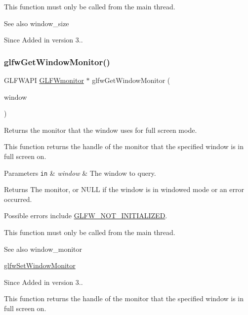 This function must only be called from the main thread.

\begin{DoxySeeAlso}{See also}
window\+\_\+size
\end{DoxySeeAlso}
\begin{DoxySince}{Since}
Added in version 3.. 
\end{DoxySince}
\mbox{\label{group__window_gad441645a53bc9274a0ee163d40f0c637}} 
\subsubsection{\texorpdfstring{glfw\+Get\+Window\+Monitor()}{glfwGetWindowMonitor()}}
{\footnotesize\ttfamily G\+L\+F\+W\+A\+PI \hyperlink{group__monitor_ga8d9efd1cde9426692c73fe40437d0ae3}{G\+L\+F\+Wmonitor} $\ast$ glfw\+Get\+Window\+Monitor (\begin{DoxyParamCaption}\item[{\hyperlink{group__window_ga3c96d80d363e67d13a41b5d1821f3242}{G\+L\+F\+Wwindow} $\ast$}]{window }\end{DoxyParamCaption})}



Returns the monitor that the window uses for full screen mode. 

This function returns the handle of the monitor that the specified window is in full screen on.


\begin{DoxyParams}[1]{Parameters}
\mbox{\tt in}  & {\em window} & The window to query. \\
\hline
\end{DoxyParams}
\begin{DoxyReturn}{Returns}
The monitor, or {\ttfamily N\+U\+LL} if the window is in windowed mode or an error occurred.
\end{DoxyReturn}
Possible errors include \hyperlink{group__errors_ga2374ee02c177f12e1fa76ff3ed15e14a}{G\+L\+F\+W\+\_\+\+N\+O\+T\+\_\+\+I\+N\+I\+T\+I\+A\+L\+I\+Z\+ED}.

This function must only be called from the main thread.

\begin{DoxySeeAlso}{See also}
window\+\_\+monitor 

\hyperlink{group__window_ga12fabf78575e59c00f822f323ae0b6ae}{glfw\+Set\+Window\+Monitor}
\end{DoxySeeAlso}
\begin{DoxySince}{Since}
Added in version 3..
\end{DoxySince}
This function returns the handle of the monitor that the specified window is in full screen on.


